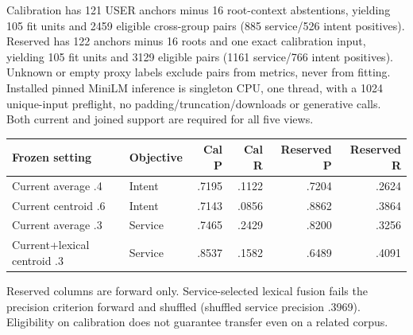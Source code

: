 \documentclass[11pt]{article}
\begin{document}
Calibration has 121 USER anchors minus 16 root-context abstentions, yielding 105
fit units and 2459 eligible cross-group pairs (885 service/526 intent positives).
Reserved has 122 anchors minus 16 roots and one exact calibration input, yielding
105 fit units and 3129 eligible pairs (1161 service/766 intent positives).
Unknown or empty proxy labels exclude pairs from metrics, never from fitting.
Installed pinned MiniLM inference is singleton CPU, one thread, with a 1024
unique-input preflight, no padding/truncation/downloads or generative calls.
Both current and joined support are required for all five views.

\begin{center}
\small
\begin{tabular}{llrrrr}
\toprule
Frozen setting & Objective & Cal P & Cal R & Reserved P & Reserved R \\
\midrule
Current average .4 & Intent & .7195 & .1122 & .7204 & .2624 \\
Current centroid .6 & Intent & .7143 & .0856 & .8862 & .3864 \\
Current average .3 & Service & .7465 & .2429 & .8200 & .3256 \\
Current+lexical centroid .3 & Service & .8537 & .1582 & .6489 & .4091 \\
\bottomrule
\end{tabular}
\end{center}
Reserved columns are forward only. Service-selected lexical fusion fails the
precision criterion forward and shuffled (shuffled service precision .3969).
Eligibility on calibration does not guarantee transfer even on a related corpus.
\end{document}
